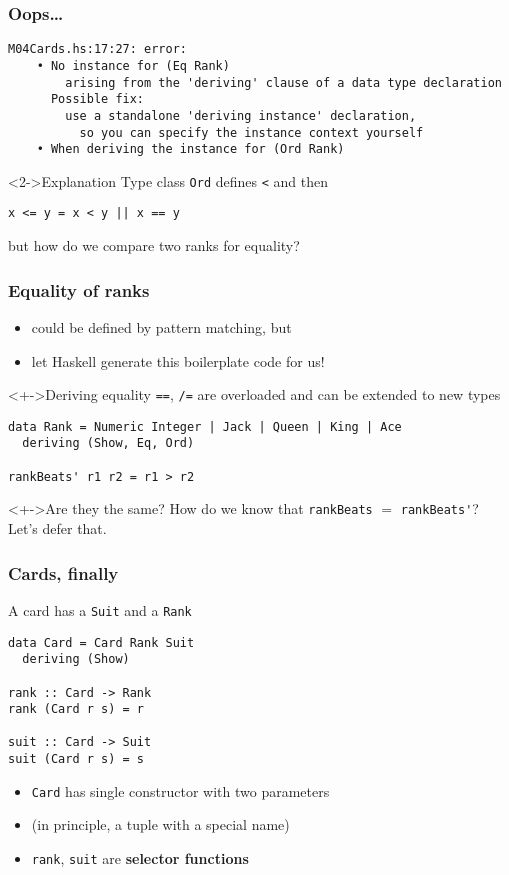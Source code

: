 \documentclass{beamer}
\begin{document}
\begin{frame}[fragile]
  \frametitle{Oops\dots}
\begin{verbatim}
M04Cards.hs:17:27: error:
    • No instance for (Eq Rank)
        arising from the 'deriving' clause of a data type declaration
      Possible fix:
        use a standalone 'deriving instance' declaration,
          so you can specify the instance context yourself
    • When deriving the instance for (Ord Rank)
\end{verbatim}
  \begin{block}<2->{Explanation}
    Type class \lstinline{Ord} defines \texttt{<} and then
\begin{lstlisting}
x <= y = x < y || x == y
\end{lstlisting}
    but how do we compare two ranks for equality?
  \end{block}
\end{frame}

\begin{frame}[fragile]
  \frametitle{Equality of ranks}
  \begin{itemize}
  \item could be defined by pattern matching, but
  \item let Haskell generate this boilerplate code for us!
  \end{itemize}
  \begin{block}<+->{Deriving equality}
    \lstinline{==}, \lstinline{/=} are overloaded and can be extended to
    new types
\begin{lstlisting}
data Rank = Numeric Integer | Jack | Queen | King | Ace
  deriving (Show, Eq, Ord)

rankBeats' r1 r2 = r1 > r2
\end{lstlisting}
  \end{block}
  \begin{block}<+->{Are they the same?}
    How do we know that \lstinline{rankBeats} $=$ \lstinline{rankBeats'}?
    Let's defer that.

  \end{block}
\end{frame}

\begin{frame}[fragile]
  \frametitle{Cards, finally}
  A card has a \lstinline{Suit} and a \lstinline{Rank}
\begin{lstlisting}
data Card = Card Rank Suit
  deriving (Show)

rank :: Card -> Rank
rank (Card r s) = r

suit :: Card -> Suit
suit (Card r s) = s
\end{lstlisting}
  \begin{itemize}
  \item \lstinline{Card} has single constructor with two parameters
  \item  (in principle, a tuple with a special name)
  \item \lstinline{rank}, \lstinline{suit} are \textbf{selector functions}
  \end{itemize}
\end{frame}
\end{document}
